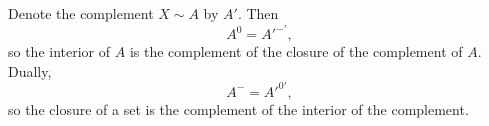 Denote the complement $X \sim A$ by $A'$. Then
$$
A^{0} = A'^{-'},
$$
so the interior of $A$ is the complement of the closure of the complement of $A$. Dually,
$$
A^{-} = A'^{0'},
$$
so the closure of a set is the complement of the interior of the complement.
